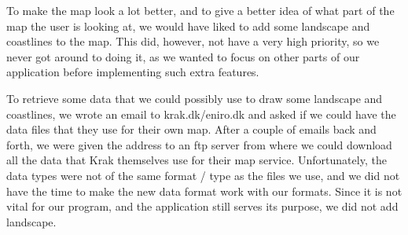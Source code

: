 To make the map look a lot better, and to give a better idea of what part of the map the user is looking at, we would have liked to add some landscape and coastlines to the map. This did, however, not have a very high priority, so we never got around to doing it, as we wanted to focus on other parts of our application before implementing such extra features.

To retrieve some data that we could possibly use to draw some landscape and coastlines, we wrote an email to krak.dk/eniro.dk and asked if we could have the data files that they use for their own map. After a couple of emails back and forth, we were given the address to an ftp server from where we could download all the data that Krak themselves use for their map service. Unfortunately, the data types were not of the same format / type as the files we use, and we did not have the time to make the new data format work with our formats. Since it is not vital for our program, and the application still serves its purpose, we did not add landscape.